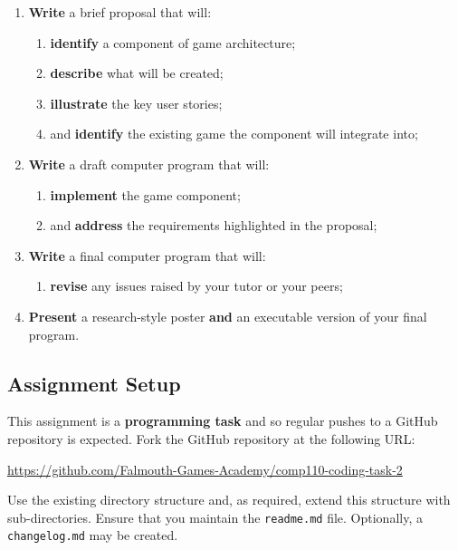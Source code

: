 \documentclass{../fal_assignment}
\begin{document}
\begin{enumerate}[label=(\alph*)]
    \item \textbf{Write} a brief proposal that will:
    	\begin{enumerate}[label=\roman*.]
    		\item \textbf{identify} a component of game architecture;
    		\item \textbf{describe} what will be created;
    		\item \textbf{illustrate} the key user stories;
    		\item and \textbf{identify} the existing game the component will integrate into;
	\end{enumerate}
    \item \textbf{Write} a draft computer program that will:
        	\begin{enumerate}[label=\roman*.]
    		\item \textbf{implement} the game component;
    		\item and \textbf{address} the requirements highlighted in the proposal;
	\end{enumerate}
    \item \textbf{Write} a final computer program that will:
    	\begin{enumerate}[label=\roman*.]
    		\item \textbf{revise} any issues raised by your tutor or your peers;
	\end{enumerate}
    \item \textbf{Present} a research-style poster \textbf{and} an executable version of your final program.
\end{enumerate}


\subsection*{Assignment Setup}

This assignment is a \textbf{programming task} and so regular pushes to a GitHub repository is expected. Fork the GitHub repository at the following URL:

\indent \url{https://github.com/Falmouth-Games-Academy/comp110-coding-task-2}

Use the existing directory structure and, as required, extend this structure with sub-directories. Ensure that you maintain the \texttt{readme.md} file. Optionally, a \texttt{changelog.md} may be created.
\end{document}
